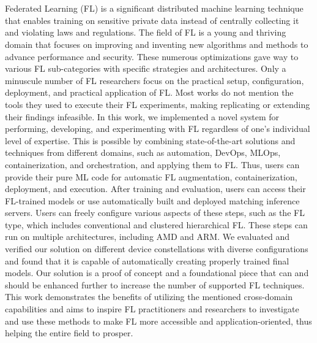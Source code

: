\chapter{\abstractname}

Federated Learning (FL) is a significant distributed machine learning technique that enables training on sensitive private data instead of centrally collecting it and violating laws and regulations.
The field of FL is a young and thriving domain that focuses on improving and inventing new algorithms and methods to advance performance and security.
These numerous optimizations gave way to various FL sub-categories with specific strategies and architectures.
Only a minuscule number of FL researchers focus on the practical setup, configuration, deployment, and practical application of FL.
Most works do not mention the tools they used to execute their FL experiments, making replicating or extending their findings infeasible.
In this work, we implemented a novel system for performing, developing, and experimenting with FL regardless of one's individual level of expertise.
This is possible by combining state-of-the-art solutions and techniques from different domains, such as automation, DevOps, MLOps, containerization, and orchestration, and applying them to FL.
Thus, users can provide their pure ML code for automatic FL augmentation, containerization, deployment, and execution.
After training and evaluation, users can access their FL-trained models or use automatically built and deployed matching inference servers.
Users can freely configure various aspects of these steps, such as the FL type, which includes conventional and clustered hierarchical FL.
These steps can run on multiple architectures, including AMD and ARM.
We evaluated and verified our solution on different device constellations with diverse configurations and found that it is capable of automatically creating properly trained final models.
Our solution is a proof of concept and a foundational piece that can and should be enhanced further to increase the number of supported FL techniques.
This work demonstrates the benefits of utilizing the mentioned cross-domain capabilities and aims to inspire FL practitioners and researchers to investigate and use these methods to make FL more accessible and application-oriented, thus helping the entire field to prosper.
